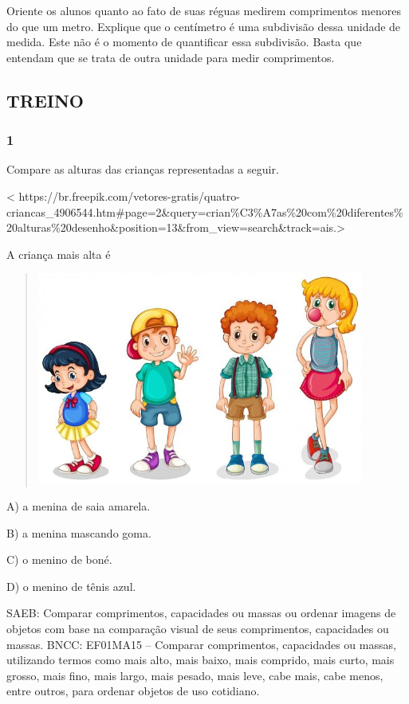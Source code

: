 Oriente os alunos quanto ao fato de suas réguas medirem
comprimentos menores do que um metro. Explique que o centímetro
é uma subdivisão dessa unidade de medida. Este não é o momento de quantificar essa subdivisão.
Basta que entendam que se trata de outra unidade para medir
comprimentos.

\subsection{TREINO}\label{treino-2}

\subsubsection{1}\label{section-36}

Compare as alturas das crianças representadas a seguir.

\textless{}
https://br.freepik.com/vetores-gratis/quatro-criancas\_4906544.htm\#page=2\&query=crian\%C3\%A7as\%20com\%20diferentes\%20alturas\%20desenho\&position=13\&from\_view=search\&track=ais.\textgreater{}

A criança mais alta é

\begin{quote}
\includegraphics[width=4.23198in,height=2.75148in]{media/image32.jpg}
\end{quote}

A) a menina de saia amarela.

B) a menina mascando goma.

C) o menino de boné.

D) o menino de tênis azul.

SAEB: Comparar comprimentos, capacidades ou massas ou ordenar
imagens de objetos com base na comparação visual de seus comprimentos,
capacidades ou massas.
BNCC: EF01MA15 -- Comparar comprimentos, capacidades ou massas,
utilizando termos como mais alto, mais baixo, mais comprido, mais curto,
mais grosso, mais fino, mais largo, mais pesado, mais leve, cabe mais,
cabe menos, entre outros, para ordenar objetos de uso cotidiano.

